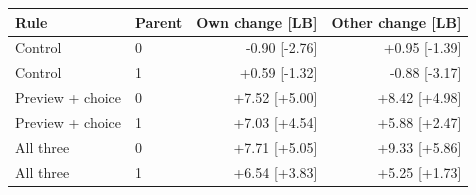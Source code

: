 \begin{tabular}{llrr}
\toprule
Rule & Parent & Own change [LB] & Other change [LB] \\
\midrule
Control & 0 & -0.90 [-2.76] & +0.95 [-1.39] \\
Control & 1 & +0.59 [-1.32] & -0.88 [-3.17] \\
Preview + choice & 0 & +7.52 [+5.00] & +8.42 [+4.98] \\
Preview + choice & 1 & +7.03 [+4.54] & +5.88 [+2.47] \\
All three & 0 & +7.71 [+5.05] & +9.33 [+5.86] \\
All three & 1 & +6.54 [+3.83] & +5.25 [+1.73] \\
\bottomrule
\end{tabular}
